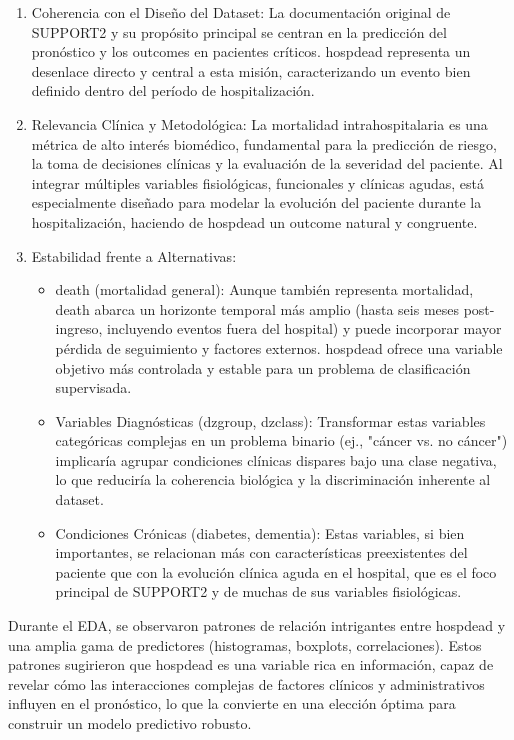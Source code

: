 \begin{enumerate}
  \item Coherencia con el Diseño del Dataset: La documentación original de SUPPORT2
    y su propósito principal se centran en la predicción del pronóstico y los
    outcomes en pacientes críticos. hospdead representa un desenlace directo y
    central a esta misión, caracterizando un evento bien definido dentro del
    período de hospitalización.
  \item Relevancia Clínica y Metodológica: La mortalidad intrahospitalaria es una
    métrica de alto interés biomédico, fundamental para la predicción de riesgo, la toma de decisiones clínicas y la evaluación de
    la severidad del paciente. Al integrar múltiples variables
    fisiológicas, funcionales y clínicas agudas, está especialmente diseñado
    para modelar la evolución del paciente durante la hospitalización, haciendo
    de hospdead un outcome natural y congruente.
  \item Estabilidad frente a Alternativas:
    \begin{itemize}
      \item death (mortalidad general): Aunque también representa mortalidad, death
        abarca un horizonte temporal más amplio (hasta seis meses post-ingreso,
        incluyendo eventos fuera del hospital) y puede incorporar mayor pérdida
        de seguimiento y factores externos. hospdead ofrece una variable
        objetivo más controlada y estable para un problema de clasificación
        supervisada.
      \item Variables Diagnósticas (dzgroup, dzclass): Transformar estas variables
        categóricas complejas en un problema binario (ej., "cáncer vs. no
        cáncer") implicaría agrupar condiciones clínicas dispares bajo una
        clase negativa, lo que reduciría la coherencia biológica y la
        discriminación inherente al dataset.
      \item Condiciones Crónicas (diabetes, dementia): Estas variables, si bien
        importantes, se relacionan más con características preexistentes del
        paciente que con la evolución clínica aguda en el hospital, que es el
        foco principal de SUPPORT2 y de muchas de sus variables fisiológicas.
    \end{itemize}
\end{enumerate}

Durante el EDA, se observaron patrones de relación intrigantes entre hospdead y
una amplia gama de predictores (histogramas, boxplots, correlaciones). Estos
patrones sugirieron que hospdead es una variable rica en información, capaz de
revelar cómo las interacciones complejas de factores clínicos y administrativos
influyen en el pronóstico, lo que la convierte en una elección óptima para
construir un modelo predictivo robusto.

